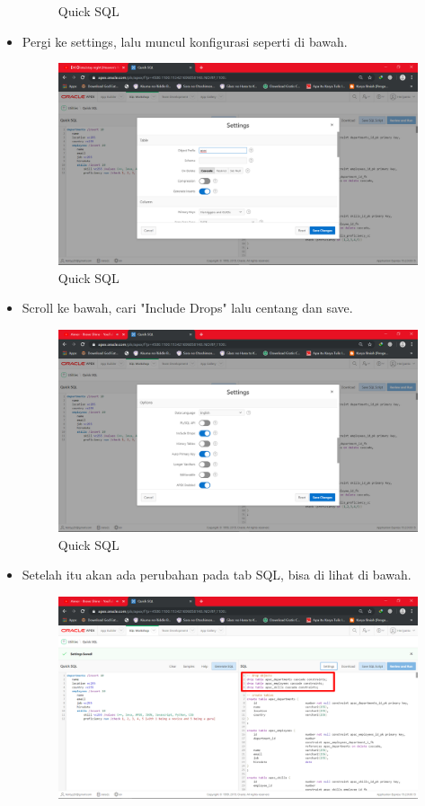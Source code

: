 \documentclass[12pt, times new roman]{article}
\begin{document}
\begin{itemize}
\begin{figure}[!htpb]
	\caption{Quick SQL}
\end{figure}
\item Pergi ke settings, lalu muncul konfigurasi seperti di bawah.
\begin{figure}[!htpb]
	\centering
	\includegraphics[width=12.5cm]{figures/Screenshot_14.png}
	\caption{Quick SQL}
\end{figure}
\item Scroll ke bawah, cari "Include Drops" lalu centang dan save.
\begin{figure}[!htpb]
	\centering
	\includegraphics[width=12.5cm]{figures/Screenshot_15.png}
	\caption{Quick SQL}
\end{figure}
\item Setelah itu akan ada perubahan pada tab SQL, bisa di lihat di bawah.
\begin{figure}[!htpb]
	\centering
	\includegraphics[width=12.5cm]{figures/Screenshot_16.png}

\end{figure}
\end{itemize}
\end{document}
